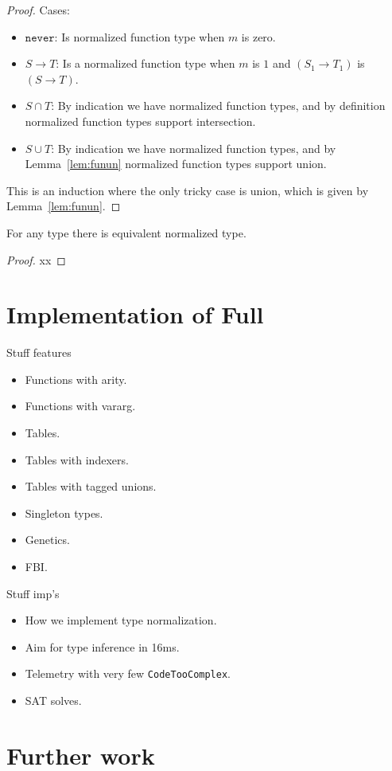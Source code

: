 \documentclass[acmsmall,review,screen]{acmart}
\newcommand{\NEVER}{\mathtt{never}}
\newcommand{\fun}{\mathbin{\rightarrow}}
\begin{document}
\begin{proof}
  Cases:
  \begin{itemize}
  \item $\NEVER$: Is normalized function type when $m$ is zero.
  \item $S \fun T$: Is a normalized function type when $m$ is $1$ and $(S_1 \fun T_1)$ is $(S \fun T)$.
  \item $S \cap T$: By indication we have normalized function types,
    and by definition normalized function types support intersection.
  \item $S \cup T$: By indication we have normalized function types,
    and by Lemma~\ref{lem:funun} normalized function types support union.
  \end{itemize}
  This is an induction where the only tricky case is union, which is given by Lemma~\ref{lem:funun}.
\end{proof}

\begin{lemma}
  For any type there is equivalent normalized type.
\end{lemma}

\begin{proof}
   xx
\end{proof}

\section{Implementation of Full }

Stuff features
\begin{itemize}
\item Functions with arity.
\item Functions with vararg.
\item Tables.
\item Tables with indexers.
\item Tables with tagged unions.
\item Singleton types.
\item Genetics.
\item FBI.
\end{itemize}
Stuff imp's
\begin{itemize}
\item How we implement type normalization.
\item Aim for type inference in 16ms.
\item Telemetry with very few \verb|CodeTooComplex|.
\item SAT solves.
\end{itemize}

\section{Further work}



\end{document}
